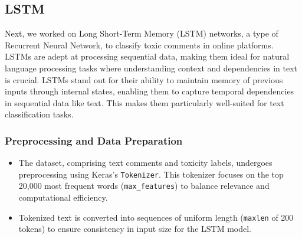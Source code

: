 \subsection{LSTM}

Next, we worked on Long Short-Term Memory (LSTM) networks, a type of Recurrent Neural Network, to classify toxic comments in online platforms. LSTMs are adept at processing sequential data, making them ideal for natural language processing tasks where understanding context and dependencies in text is crucial. LSTMs stand out for their ability to maintain memory of previous inputs through internal states, enabling them to capture temporal dependencies in sequential data like text. This makes them particularly well-suited for text classification tasks.

\subsubsection{Preprocessing and Data Preparation}
\begin{itemize}
    \item The dataset, comprising text comments and toxicity labels, undergoes preprocessing using Keras’s \texttt{Tokenizer}. This tokenizer focuses on the top 20,000 most frequent words (\texttt{max\_features}) to balance relevance and computational efficiency.
    \item Tokenized text is converted into sequences of uniform length (\texttt{maxlen} of 200 tokens) to ensure consistency in input size for the LSTM model.
\end{itemize}

